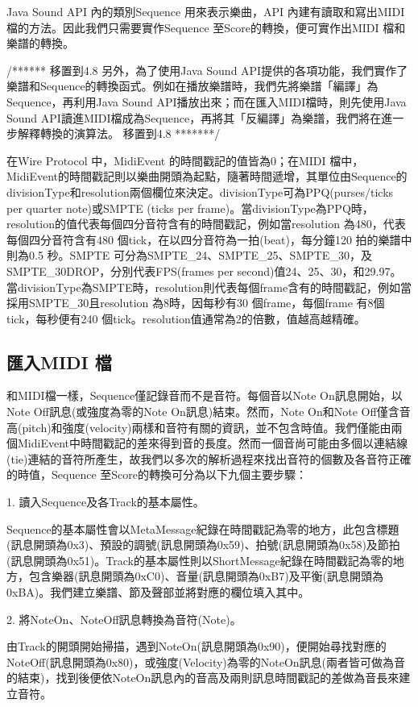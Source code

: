 \documentclass[12pt,a4paper,oneside]{report}
\begin{document}
Java Sound API 內的類別Sequence 用來表示樂曲，API 內建有讀取和寫出MIDI檔的方法。因此我們只需要實作Sequence 至Score的轉換，便可實作出MIDI 檔和樂譜的轉換。

/******  移置到4.8  
另外，為了使用Java Sound API提供的各項功能，我們實作了樂譜和Sequence的轉換函式。例如在播放樂譜時，我們先將樂譜「編譯」為Sequence，再利用Java Sound API播放出來；而在匯入MIDI檔時，則先使用Java Sound API讀進MIDI檔成為Sequence，再將其「反編譯」為樂譜，我們將在進一步解釋轉換的演算法。
移置到4.8  *******/

在Wire Protocol 中，MidiEvent 的時間戳記的值皆為0；在MIDI 檔中，MidiEvent的時間戳記則以樂曲開頭為起點，隨著時間遞增，其單位由Sequence的divisionType和resolution兩個欄位來決定。divisionType可為PPQ(purses/ticks per quarter note)或SMPTE (ticks per frame)。當divisionType為PPQ時，resolution的值代表每個四分音符含有的時間戳記，例如當resolution 為480，代表每個四分音符含有480 個tick，在以四分音符為一拍(beat)，每分鐘120 拍的樂譜中則為0.5 秒。SMPTE 可分為SMPTE\_24、SMPTE\_25、SMPTE\_30，及SMPTE\_30DROP，分別代表FPS(frames per second)值24、25、30，和29.97。當divisionType為SMPTE時，resolution則代表每個frame含有的時間戳記，例如當採用SMPTE\_30且resolution 為8時，因每秒有30 個frame，每個frame 有8個tick，每秒便有240 個tick。resolution值通常為2的倍數，值越高越精確。

\subsection{匯入MIDI 檔}

和MIDI檔一樣，Sequence僅記錄音而不是音符。每個音以Note On訊息開始，以Note Off訊息(或強度為零的Note On訊息)結束。然而，Note On和Note Off僅含音高(pitch)和強度(velocity)兩樣和音符有關的資訊，並不包含時值。我們僅能由兩個MidiEvent中時間戳記的差來得到音的長度。然而一個音尚可能由多個以連結線(tie)連結的音符所產生，故我們以多次的解析過程來找出音符的個數及各音符正確的時值，Sequence 至Score的轉換可分為以下九個主要步驟： 

1. 讀入Sequence及各Track的基本屬性。 

Sequence的基本屬性會以MetaMessage紀錄在時間戳記為零的地方，此包含標題(訊息開頭為0x3)、預設的調號(訊息開頭為0x59)、拍號(訊息開頭為0x58)及節拍(訊息開頭為0x51)。Track的基本屬性則以ShortMessage紀錄在時間戳記為零的地方，包含樂器(訊息開頭為0xC0)、音量(訊息開頭為0xB7)及平衡(訊息開頭為0xBA)。我們建立樂譜、節及聲部並將對應的欄位填入其中。

2. 將NoteOn、NoteOff訊息轉換為音符(Note)。 

由Track的開頭開始掃描，遇到NoteOn(訊息開頭為0x90)，便開始尋找對應的NoteOff(訊息開頭為0x80)，或強度(Velocity)為零的NoteOn訊息(兩者皆可做為音的結束)，找到後便依NoteOn訊息內的音高及兩則訊息時間戳記的差做為音長來建立音符。
\end{document}
